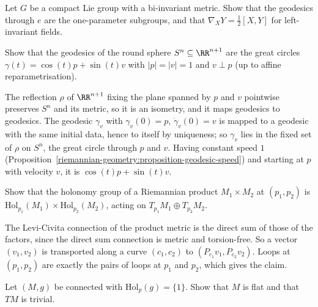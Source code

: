 \begin{exercise}\label{riemannian-geometry:exercise-bi-invariant}
Let $G$ be a compact Lie group with a bi-invariant metric. Show that the geodesics through $e$ are the one-parameter subgroups, and that $\nabla_XY = \frac12[X, Y]$ for left-invariant fields.
\end{exercise}
\begin{exercise}\label{riemannian-geometry:exercise-great-circles}
Show that the geodesics of the round sphere $S^n \subseteq \RR^{n+1}$ are the great circles $\gamma(t) = \cos(t)p + \sin(t)v$ with $|p| = |v| = 1$ and $v \perp p$ (up to affine reparametrisation).
\end{exercise}

\begin{solution}
The reflection $\rho$ of $\RR^{n+1}$ fixing the plane spanned by $p$ and $v$ pointwise preserves $S^n$ and its metric, so it is an isometry, and it maps geodesics to geodesics. The geodesic $\gamma_v$ with $\gamma_v(0) = p$, $\dot\gamma_v(0) = v$
is mapped to a geodesic with the same initial data, hence to itself by uniqueness; so $\gamma_v$ lies in the fixed set of $\rho$ on $S^n$, the great circle through $p$ and $v$. Having constant speed $1$
(Proposition~\ref{riemannian-geometry:proposition-geodesic-speed}) and starting at $p$ with velocity $v$, it is $\cos(t)p + \sin(t)v$.
\end{solution}

\begin{exercise}\label{riemannian-geometry:exercise-holonomy-product}
Show that the holonomy group of a Riemannian product $M_1 \times M_2$ at $(p_1, p_2)$ is $\mathrm{Hol}_{p_1}(M_1) \times \mathrm{Hol}_{p_2}(M_2)$, acting on $T_{p_1}M_1 \oplus T_{p_2}M_2$.
\end{exercise}

\begin{solution}
The Levi-Civita connection of the product metric is the direct sum of those of the factors, since the direct sum connection is metric and torsion-free. So a vector $(v_1, v_2)$ is transported along a curve $(c_1, c_2)$ to
$(P_{c_1}v_1, P_{c_2}v_2)$. Loops at $(p_1, p_2)$ are exactly the pairs of loops at $p_1$ and $p_2$, which gives the claim.
\end{solution}

\begin{exercise}\label{riemannian-geometry:exercise-trivial-holonomy}
Let $(M, g)$ be connected with $\mathrm{Hol}_p(g) = \{1\}$. Show that $M$ is flat and that $TM$ is trivial.
\end{exercise}

